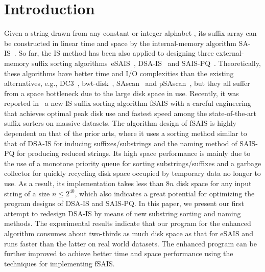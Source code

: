 \documentclass[10pt,journal,compsoc]{IEEEtran}
\begin{document}
\maketitle

\IEEEdisplaynontitleabstractindextext

\IEEEpeerreviewmaketitle

\section{Introduction}\label{sec:introduction}

Given a string drawn from any constant or integer alphabet	, its suffix array can be constructed in linear time and space by the internal-memory algorithm SA-IS~\cite{Nong11}. So far, the IS method has been also applied to designing three external-memory suffix sorting algorithms~eSAIS~\cite{Bingmann12}, DSA-IS~\cite{Nong15} and SAIS-PQ~\cite{Liu15}. Theoretically, these algorithms have better time and I/O complexities than the existing alternatives, e.g., DC3~\cite{Dementiev2008a}, bwt-disk~\cite{Ferragina2012}, SAscan~\cite{Karkkainen2014} and pSAscan~\cite{Karkkainen2015}, but they all suffer from a space bottleneck due to the large disk space in use. Recently, it was reported in~\cite{Karkkainen2017} a new IS suffix sorting algorithm fSAIS with a careful engineering that achieves optimal peak disk use and fastest speed among the state-of-the-art suffix sorters on massive datasets. The algorithm design of fSAIS is highly dependent on that of the prior arts, where it uses a sorting method similar to that of DSA-IS for inducing suffixes/substrings and the naming method of SAIS-PQ for producing reduced strings. Its high space performance is mainly due to the use of a monotone priority queue for sorting substrings/suffixes and a garbage collector for quickly recycling disk space occupied by temporary data no longer to use. As a result, its implementation takes less than $8n$ disk space for any input string of a size $n \le 2^{40}$, which also indicates a great potential for optimizing the program designs of DSA-IS and SAIS-PQ. In this paper, we present our first attempt to redesign DSA-IS by means of new substring sorting and naming methods. The experimental results indicate that our program for the enhanced algorithm consumes about two-thirds as much disk space as that for eSAIS and runs faster than the latter on real world datasets. The enhanced program can be further improved to achieve better time and space performance using the techniques for implementing fSAIS.
\end{document}
